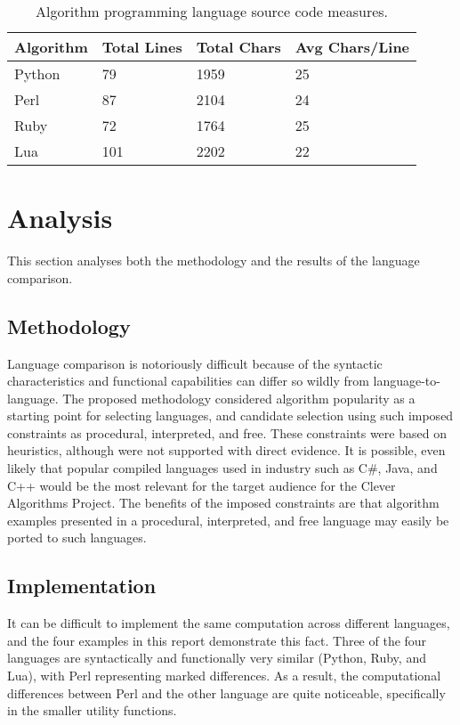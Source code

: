 \documentclass[a4paper, 11pt]{article}
\begin{document}
\begin{table}[ht]
	\centering
		\begin{tabularx}{\textwidth}{lXXX}
		\toprule
		\textbf{Algorithm} & \textbf{Total Lines} & \textbf{Total Chars} & \textbf{Avg Chars/Line} \\ 
		\toprule
		Python & 79 & 1959 & 25 \\
		Perl & 87 & 2104 & 24 \\		
		Ruby & 72 & 1764 & 25 \\
		Lua & 101 & 2202 & 22 \\
		\bottomrule
		\end{tabularx}	
	\caption{Algorithm programming language source code measures.}
	\label{tab:implementation_results}
\end{table}

% 
% 
\section{Analysis}
\label{sec:analysis}
This section analyses both the methodology and the results of the language comparison.

% 
% 
\subsection{Methodology}
Language comparison is notoriously difficult because of the syntactic characteristics and functional capabilities can differ so wildly from language-to-language. 
The proposed methodology considered algorithm popularity as a starting point for selecting languages, and candidate selection using such imposed constraints as procedural, interpreted, and free. These constraints were based on heuristics, although were not supported with direct evidence. 
It is possible, even likely that popular compiled languages used in industry such as C\#, Java, and C++ would be the most relevant for the target audience for the Clever Algorithms Project. 
The benefits of the imposed constraints are that algorithm examples presented in a procedural, interpreted, and free language may easily be ported to such languages.


% 
% 
\subsection{Implementation}
It can be difficult to implement the same computation across different languages, and the four examples in this report demonstrate this fact. 
Three of the four languages are syntactically and functionally very similar (Python, Ruby, and Lua), with Perl representing marked differences. As a result, the computational differences between Perl and the other language are quite noticeable, specifically in the smaller utility functions.
\end{document}
